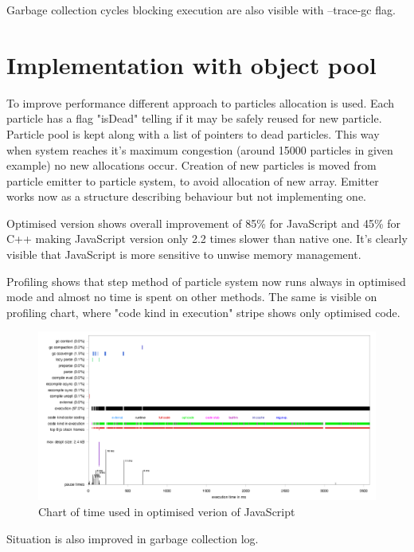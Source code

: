 Garbage collection cycles blocking execution are also visible with --trace-gc flag.



\section{Implementation with object pool}
\label{sec:particlesobjectpool}

To improve performance different approach to particles allocation is used. Each particle has a flag "isDead" telling if it may be safely reused for new particle. Particle pool is kept along with a list of pointers to dead particles. This way when system reaches it's maximum congestion (around 15000 particles in given example) no new allocations occur.
Creation of new particles is moved from particle emitter to particle system, to avoid allocation of new array. Emitter works now as a structure describing behaviour but not implementing one.




Optimised version shows overall improvement of 85\% for JavaScript and 45\% for C++ making JavaScript version only 2.2 times slower than native one. It's clearly visible that JavaScript is more sensitive to unwise memory management.



Profiling shows that step method of particle system now runs always in optimised mode and almost no time is spent on other methods. The same is visible on profiling chart, where "code kind in execution" stripe shows only optimised code.

\begin{figure}[h!]
  \caption{Chart of time used in optimised verion of JavaScript}
  \label{img:particles2profile}
  \centering
	\includegraphics[width=16cm]{particles/particles2-profile.png}
\end{figure} 

Situation is also improved in garbage collection log.


